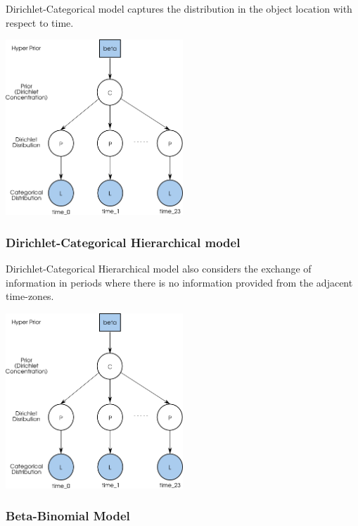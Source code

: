 \documentclass{llncs}
\begin{document}
Dirichlet-Categorical model captures the distribution in the object location with respect to time.
\begin{center}
\includegraphics[width=0.5\textwidth]{dirichlet_categorical_hierarchical.png}
\end{center}

\subsubsection{Dirichlet-Categorical Hierarchical model}

Dirichlet-Categorical Hierarchical model also considers the exchange of information in periods where there is no information provided from the adjacent time-zones.
\begin{center}

\includegraphics[width=0.5\textwidth]{dirichlet_categorical_hierarchical.png}
\end{center}


\subsubsection{Beta-Binomial Model}
\end{document}
